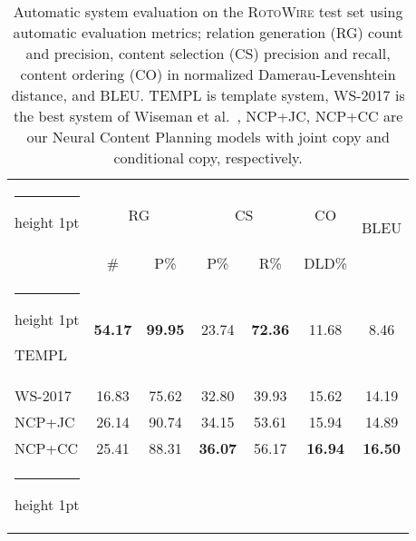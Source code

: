 \documentclass[letterpaper]{article} \usepackage{aaai19}  \usepackage{times}  \usepackage{helvet}  \usepackage{courier}  \usepackage{url}  \usepackage{graphicx}  \frenchspacing  \setlength{\pdfpagewidth}{8.5in}  \setlength{\pdfpageheight}{11in}  \graphicspath{ {images/} }
\makeatletter
\newcommand{\thickhline}{\noalign {\ifnum 0=`}\fi \hrule height 1pt
    \futurelet \reserved@a \@xhline
}
\makeatother
\begin{document}
\begin{table}[t]
\small
\centering
\begin{tabular}{@{~}l@{~}|@{~}c@{~~~}c@{~}|c@{~~~}c|c|@{~}c@{~} }
 \thickhline
 \multirow{2}{*}{Model} &\multicolumn{2}{c|}{RG} &\multicolumn{2}{c|}{CS} & CO & \multirow{2}{*}{BLEU}\\

 &\# & P\% & P\% & R\% & DLD\% & \\ \thickhline
TEMPL &\textbf{54.17} &\textbf{99.95} &23.74 &\textbf{72.36} &11.68 &8.46  \\
WS-2017 & 16.83 & 75.62 & 32.80 & 39.93 & 15.62 & 14.19 \\NCP+JC  & 26.14 & 90.74 & 34.15 & 53.61 & 15.94 & 14.89 \\ NCP+CC &25.41 & 88.31 & \textbf{36.07} & 56.17
 &\textbf{16.94} & \textbf{16.50}\\
\thickhline
\end{tabular}
\caption{\label{generation-from-plan-test-bug} Automatic system evaluation
  on the \textsc{RotoWire} test set using automatic evaluation
  metrics;  relation generation (RG)  count and precision, content selection (CS) precision and recall, content ordering (CO) in normalized
  Damerau-Levenshtein distance, and BLEU. TEMPL is template system, WS-2017 is the best system of Wiseman et al.~,
  NCP+JC, NCP+CC are our Neural Content Planning models
  with joint copy and conditional copy, respectively.}
\end{table}
\end{document}

